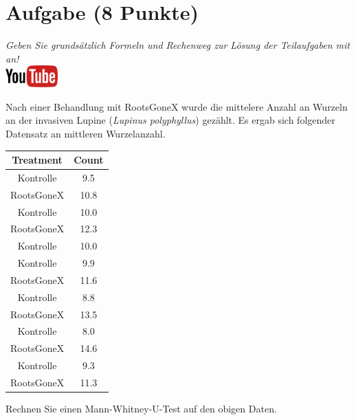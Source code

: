 \documentclass[a4paper, 10pt]{scrartcl}\usepackage[]{graphicx}\usepackage[]{xcolor}
\newenvironment{knitrout}{}{} %
\begin{document}
\section{Aufgabe \hfill (8 Punkte)}

\textit{Geben Sie grunds{\"a}tzlich Formeln und Rechenweg zur L{\"o}sung der
  Teilaufgaben mit an!} \\[1Ex]

\hfill\href{https://youtu.be/5tiJFxuZcco}{\includegraphics[width =
  2cm]{img/youtube}} %
\hspace{2Ex}




Nach einer Behandlung mit RootsGoneX wurde die mittelere Anzahl an Wurzeln
an der invasiven Lupine (\textit{Lupinus polyphyllus}) gez{\"a}hlt. Es ergab sich
folgender Datensatz an mittleren Wurzelanzahl.

\begin{knitrout}
\color{fgcolor}\begin{table}[!h]
\centering
\begin{tabular}{cc}
\toprule
Treatment & Count\\
\midrule
Kontrolle & 9.5\\
RootsGoneX & 10.8\\
Kontrolle & 10.0\\
RootsGoneX & 12.3\\
Kontrolle & 10.0\\
\addlinespace
Kontrolle & 9.9\\
RootsGoneX & 11.6\\
Kontrolle & 8.8\\
RootsGoneX & 13.5\\
Kontrolle & 8.0\\
\addlinespace
RootsGoneX & 14.6\\
Kontrolle & 9.3\\
RootsGoneX & 11.3\\
\bottomrule
\end{tabular}
\end{table}

\end{knitrout}

Rechnen Sie einen Mann-Whitney-U-Test auf den obigen Daten.
\end{document}
